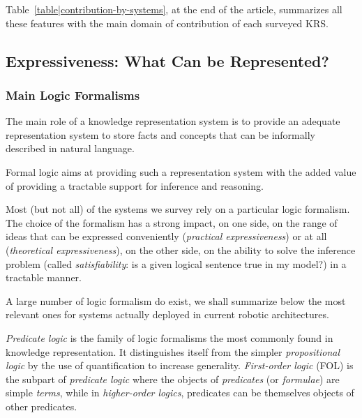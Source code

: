 \documentclass[a4paper, twocolumn]{article}
\begin{document}
Table~\ref{table|contribution-by-systems}, at the end of the article,
summarizes all these features with the main domain of contribution of each
surveyed KRS.



\subsection{Expressiveness: What Can be Represented?}
\label{sect|expressiveness}

\begin{scriptsize}
\begin{center}
\end{center}
\end{scriptsize}


\subsubsection{Main Logic Formalisms}

The main role of a knowledge representation system is to provide an adequate
representation system to store facts and concepts that can be informally
described in natural language.

Formal logic aims at providing such a representation system with the added
value of providing a tractable support for inference and reasoning.

Most (but not all) of the systems we survey rely on a particular logic
formalism. The choice of the formalism has a strong impact, on one side, on the
range of ideas that can be expressed conveniently (\emph{practical
expressiveness}) or at all (\emph{theoretical expressiveness}), on the other
side, on the ability to solve the inference problem (called
\emph{satisfiability}: is a given logical sentence true in my model?) in a
tractable manner.

A large number of logic formalism do exist, we shall summarize below the most
relevant ones for systems actually deployed in current robotic architectures.

\emph{Predicate logic} is the family of logic formalisms the most commonly
found in knowledge representation. It distinguishes itself from the simpler
\emph{propositional logic} by the use of quantification to increase generality.
\emph{First-order logic} (FOL) is the subpart of \emph{predicate logic} where the
objects of \emph{predicates} (or \emph{formulae}) are simple \emph{terms},
while in \emph{higher-order logics}, predicates can be themselves objects of
other predicates.
\end{document}
